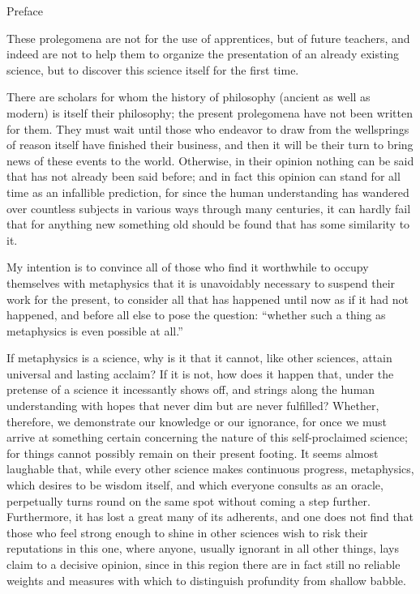 Preface

These prolegomena are not for the use of apprentices, but of future
teachers, and indeed are not to help them to organize the presentation
of an already existing science, but to discover this science itself for the
ﬁrst time.

There are scholars for whom the history of philosophy
(ancient as well as modern) is itself their philosophy;
the present prolegomena have not been written for them.
They must wait until those who endeavor to
draw from the wellsprings of reason itself have ﬁnished their business,
and then it will be their turn to bring news of these events to the world.
Otherwise, in their opinion nothing can be said that has not already
been said before; and in fact this opinion can stand for all time as an
infallible prediction, for since the human understanding has wandered
over countless subjects in various ways through many centuries, it can
hardly fail that for anything new something old should be found that has
some similarity to it.

My intention is to convince all of those who ﬁnd it worthwhile to
occupy themselves with metaphysics that it is unavoidably necessary to
suspend their work for the present, to consider all that has happened until
now as if it had not happened, and before all else to pose the question:
“whether such a thing as metaphysics is even possible at all.”

If metaphysics is a science, why is it that it cannot, like other sciences,
attain universal and lasting acclaim? If it is not, how does it happen
that, under the pretense of a science it incessantly shows off, and strings
along the human understanding with hopes that never dim but are never
fulﬁlled? Whether, therefore, we demonstrate our knowledge or our
ignorance, for once we must arrive at something certain concerning the
nature of this self-proclaimed science; for things cannot possibly remain
on their present footing. It seems almost laughable that, while every other
science makes continuous progress, metaphysics, which desires to be
wisdom itself, and which everyone consults as an oracle, perpetually turns
round on the same spot without coming a step further. Furthermore,
it has lost a great many of its adherents, and one does not ﬁnd that
those who feel strong enough to shine in other sciences wish to risk
their reputations in this one, where anyone, usually ignorant in all other
things, lays claim to a decisive opinion, since in this region there are
in fact still no reliable weights and measures with which to distinguish
profundity from shallow babble.

